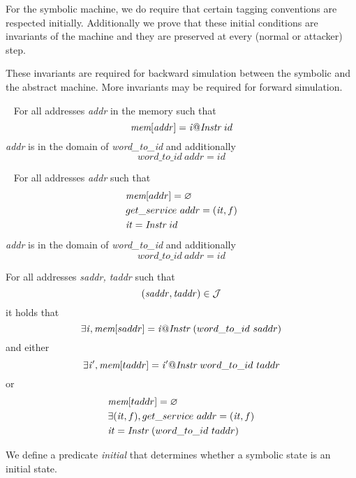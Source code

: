 For the symbolic machine, we do require that certain tagging
conventions are respected initially. Additionally we prove that
these initial conditions are invariants of the machine and they
are preserved at every (normal or attacker) step.

These invariants are required for backward simulation between
the symbolic and the abstract machine. More invariants may
be required for forward simulation.


\begin{definition}\label{instructions_tagged}
  ~ For all addresses \textit{addr} in the memory such that
  $$\textit{mem}[\mathit{addr}] = \mathit{i}@\textit{Instr}~id$$ \textit{addr}
  is in the domain of \emph{word\_to\_id} and additionally
  $$word\_to\_id ~\mathit{addr} = \mathit{id}$$
\end{definition}

\begin{definition}\label{entry_tagged}
  ~ For all addresses \textit{addr} such that 
  \begin{align*}
  & \textit{mem}[addr] = \varnothing\\
  & get\_service~addr = (\mathit{it},f)\\
  & \mathit{it} = \textit{Instr}~id
  \end{align*}
  \textit{addr} is in the domain of \emph{word\_to\_id} and additionally
  $$word\_to\_id ~\mathit{addr} = \mathit{id}$$
\end{definition}

\begin{definition}\label{valid_jmp_tagged}
  For all addresses \textit{saddr, taddr} such that
  $$(\mathit{saddr},\mathit{taddr}) \in \mathcal{J}$$ it holds that
  $$\exists \mathit{i}, \textit{mem}[saddr] = \mathit{i}@\textit{Instr}~(word\_to\_id~saddr) $$
  and either $$\exists \mathit{i'}, \textit{mem}[taddr]
  =\mathit{i'}@\textit{Instr}~word\_to\_id~taddr$$ or
  \begin{align*}
  & \textit{mem}[taddr] = \varnothing\\ 
  & \exists (\mathit{it},f), get\_service~addr = (\mathit{it},f)\\
  & \mathit{it} = \textit{Instr}~(word\_to\_id~taddr)
  \end{align*}
\end{definition}

We define a predicate \emph{initial} that determines whether a symbolic
state is an initial state.


